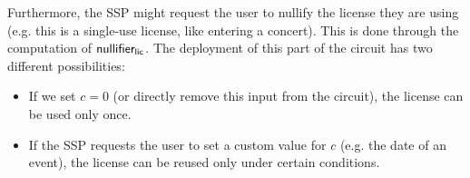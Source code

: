 Furthermore, the SSP might request the user to nullify the license they are using (e.g. this is a single-use license, like entering a concert). This is done through the computation of $\mathsf{nullifier_{lic}}$. The deployment of this part of the circuit has two different possibilities:
\begin{itemize}
	\item If we set $c = 0$ (or directly remove this input from the circuit), the license can be used only once.
	\item If the SSP requests the user to set a custom value for $c$ (e.g. the date of an event), the license can be reused only under certain conditions.
\end{itemize}
